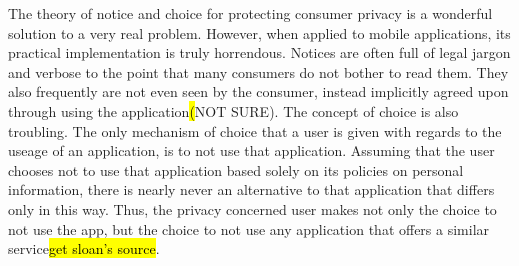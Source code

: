The theory of notice and choice for protecting consumer privacy is a wonderful solution to a very real problem. However, when applied to mobile applications, its practical implementation is truly horrendous. Notices are often full of legal jargon and verbose to the point that many consumers do not bother to read them\cite{something}. They also frequently are not even seen by the consumer, instead implicitly agreed upon through using the application\hl(NOT SURE). The concept of choice is also troubling. The only mechanism of choice that a user is given with regards to the useage of an application, is to not use that application. Assuming that the user chooses not to use that application based solely on its policies on personal information, there is nearly never an alternative to that application that differs only in this way. Thus, the privacy concerned user makes not only the choice to not use the app, but the choice to not use any application that offers a similar service\hl{get sloan's source}. 



